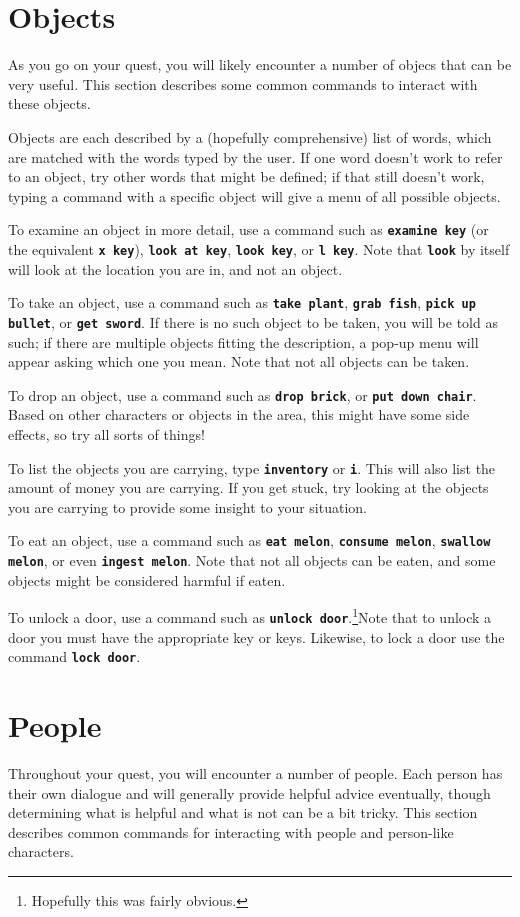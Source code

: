 \documentclass{report}
\begin{document}
\section{Objects}
As you go on your quest, you will likely encounter a number of objecs that can be very useful. This section describes some common commands to interact with these objects.

Objects are each described by a (hopefully comprehensive) list of words, which are matched with the words typed by the user. If one word doesn't work to refer to an object, try other words that might be defined; if that still doesn't work, typing a command with a specific object will give a menu of all possible objects.

To examine an object in more detail, use a command such as {\tt \bf examine key} (or the equivalent {\tt \bf x key}), {\tt \bf look at key}, {\tt \bf look key}, or {\tt \bf l key}. Note that {\tt \bf look} by itself will look at the location you are in, and not an object.

To take an object, use a command such as {\tt \bf take plant}, {\tt \bf grab fish}, {\tt \bf pick up bullet}, or {\tt \bf get sword}. If there is no such object to be taken, you will be told as such; if there are multiple objects fitting the description, a pop-up menu will appear asking which one you mean. Note that not all objects can be taken.

To drop an object, use a command such as {\tt \bf drop brick}, or {\tt \bf put down chair}. Based on other characters or objects in the area, this might have some side effects, so try all sorts of things!

To list the objects you are carrying, type {\tt \bf inventory} or {\tt \bf i}. This will also list the amount of money you are carrying. If you get stuck, try looking at the objects you are carrying to provide some insight to your situation.

To eat an object, use a command such as {\tt \bf eat melon}, {\tt \bf consume melon}, {\tt \bf swallow melon}, or even {\tt \bf ingest melon}. Note that not all objects can be eaten, and some objects might be considered harmful if eaten.

To unlock a door, use a command such as {\tt \bf unlock door}.\footnote{Hopefully this was fairly obvious.}Note that to unlock a door you must have the appropriate key or keys.  Likewise, to lock a door use the command {\tt \bf lock door}.

\section{People}
Throughout your quest, you will encounter a number of people. Each person has their own dialogue and will generally provide helpful advice eventually, though determining what is helpful and what is not can be a bit tricky. This section describes common commands for interacting with people and person-like characters.
\end{document}

